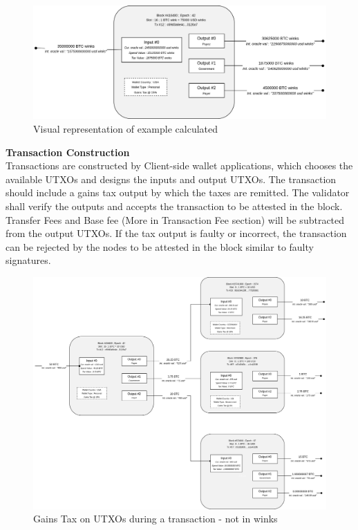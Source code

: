 \documentclass[letterpaper,11pt]{article}
\begin{document}
\begin{center}
\begin{figure}
\includegraphics[width=\textwidth]{gainstaxeg}
\caption{Visual representation of example calculated}
\end{figure}
\end{center}

\textbf{Transaction Construction}\\

Transactions are constructed by Client-side wallet applications, which chooses the available UTXOs and designs the inputs and output UTXOs. The transaction should include a gains tax output by which the taxes are remitted. The validator shall verify the outputs and accepts the transaction to be attested in the block. Transfer Fees and Base fee (More in Transaction Fee section) will be subtracted from the output UTXOs. If the tax output is faulty or incorrect, the transaction can be rejected by the nodes to be attested in the block similar to faulty signatures.\\


\begin{figure}[H]
\begin{center}
\includegraphics[width=\textwidth]{gainstaxutxo}
\caption{Gains Tax on UTXOs during a transaction - not in winks}
\end{center}
\end{figure}
\end{document}
